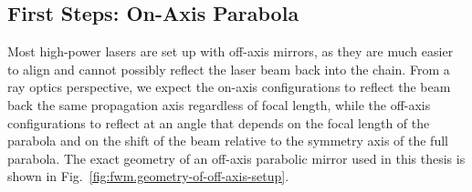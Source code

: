 \documentclass[11pt,SymmetricalJury]{inrsthesis/inrsthesis}
\begin{document}
\subsection{First Steps: On-Axis Parabola}

Most high-power lasers are set up with off-axis mirrors, as they are much
easier to align and cannot possibly reflect the laser beam back into the
chain. From a ray optics perspective, we expect the on-axis configurations
to reflect the beam back the same propagation axis regardless of focal length,
while the off-axis configurations to reflect at an angle that depends on the focal
length of the parabola and on the shift of the beam relative to the symmetry
axis of the full parabola.
The exact geometry of an off-axis parabolic mirror used in this thesis
is shown in Fig.~\ref{fig:fwm.geometry-of-off-axis-setup}.
\end{document}

